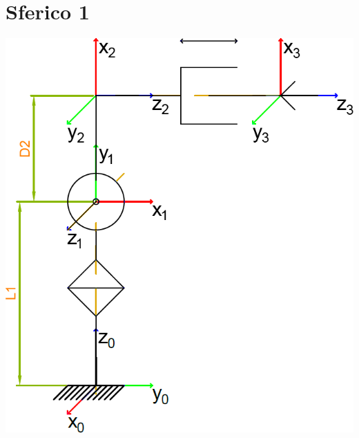 \documentclass[a4paper,11pt]{article}
\begin{document}
\section*{Sferico 1}
\includegraphics{Sorgenti/Strutture/Sferico1.png}

\end{document}

